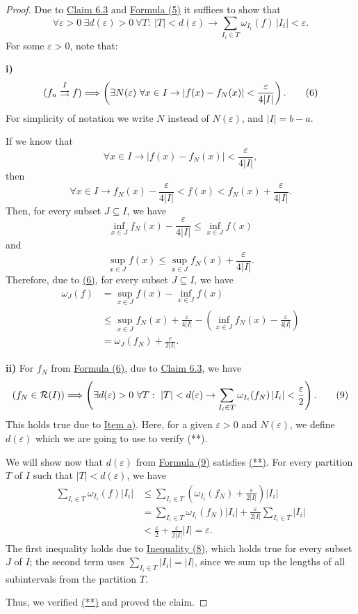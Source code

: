 \begin{proof}
Due to \hyperref[claim:6.3]{Claim 6.3} and \hyperref[eq:6:5:1]{Formula (5)} it suffices to show that
\[
\forall\varepsilon>0\ \exists d(\varepsilon)>0\ \forall T:\ |T|<d(\varepsilon)
\to \sum_{I_i\in T}\omega_{I_i}(f)\,|I_i|<\varepsilon.
\tag{**}\label{eq:6:starstar:2}
\]
For some $\varepsilon>0$, note that:

\textbf{i)}
\[
(f_n\mathrel{\overset{I}{\rightrightarrows}}f)
\Longrightarrow
\left(\exists N(\varepsilon)\ \forall x\in I\to |f(x)-f_N(x)|<\frac{\varepsilon}{4|I|}\right).
\tag{6}\label{eq:6:6:1}
\]
For simplicity of notation we write $N$ instead of $N(\varepsilon)$, and $|I|=b-a$.

If we know that
\[
\forall x\in I\to |f(x)-f_N(x)|<\frac{\varepsilon}{4|I|},
\]
then
\[
\forall x\in I\to f_N(x)-\frac{\varepsilon}{4|I|}<f(x)<f_N(x)+\frac{\varepsilon}{4|I|}.
\]
Then, for every subset $J\subseteq I$, we have
\[
\inf_{x\in J}f_N(x)-\frac{\varepsilon}{4|I|}\leq \inf_{x\in J}f(x)
\tag{7a}\label{eq:6:7a:1}
\]
and
\[
\sup_{x\in J}f(x)\leq \sup_{x\in J}f_N(x)+\frac{\varepsilon}{4|I|}.
\tag{7b}\label{eq:6:7b:1}
\]
Therefore, due to \hyperref[eq:6:6:1]{(6)}, for every subset $J\subseteq I$, we have
\begin{align*}
\omega_J(f)
&=\sup_{x\in J}f(x)-\inf_{x\in J}f(x)\\
&\leq \sup_{x\in J}f_N(x)+\frac{\varepsilon}{4|I|}
-\left(\inf_{x\in J}f_N(x)-\frac{\varepsilon}{4|I|}\right)\\
&=\omega_J(f_N)+\frac{\varepsilon}{2|I|}.
\tag{8}\label{eq:6:8:1}
\end{align*}

\textbf{ii)} For $f_N$ from \hyperref[eq:6:6:1]{Formula (6)}, due to \hyperref[claim:6.3]{Claim 6.3}, we have
\[
(f_N\in\mathcal{R}(I))
\Longrightarrow
\left(\exists d(\varepsilon)>0\ \forall T:\ |T|<d(\varepsilon)
\to \sum_{I_i\in T}\omega_{I_i}(f_N)\,|I_i|<\frac{\varepsilon}{2}\right).
\tag{9}\label{eq:6:9:1}
\]
This holds true due to \hyperref[item:claim:6.4:a]{Item a)}. Here, for a given $\varepsilon>0$ and $N(\varepsilon)$, we define $d(\varepsilon)$ which we are going to use to verify (**).

We will show now that $d(\varepsilon)$ from \hyperref[eq:6:9:1]{Formula (9)} satisfies \hyperref[eq:6:starstar:1]{(**)}. For every partition $T$ of $I$ such that $|T|<d(\varepsilon)$, we have
\begin{align*}
\sum_{I_i\in T}\omega_{I_i}(f)|I_i|
&\leq \sum_{I_i\in T}\left(\omega_{I_i}(f_N)+\frac{\varepsilon}{2|I|}\right)|I_i|\\
&=\sum_{I_i\in T}\omega_{I_i}(f_N)|I_i|
+\frac{\varepsilon}{2|I|}\sum_{I_i\in T}|I_i|\\
&<\frac{\varepsilon}{2}+\frac{\varepsilon}{2|I|}|I|=\varepsilon.
\end{align*}
The first inequality holds due to \hyperref[eq:6:8:1]{Inequality (8)}, which holds true for every subset $J$ of $I$; the second term uses $\sum_{I_i\in T}|I_i|=|I|$, since we sum up the lengths of all subintervals from the partition $T$.

Thus, we verified \hyperref[eq:6:starstar:1]{(**)} and proved the claim.
\end{proof}

